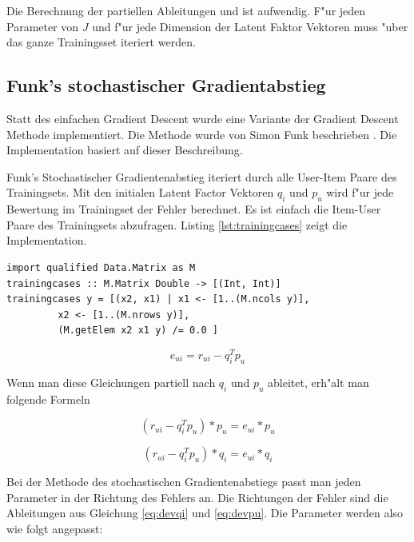 \documentclass[a4paper, 12pt]{article}
\begin{document}
Die Berechnung der partiellen Ableitungen \label{eq:decx} und \label{eq:dectheta} ist aufwendig. F"ur jeden Parameter von $J$ und f"ur jede Dimension der Latent Faktor Vektoren muss "uber das ganze Trainingsset iteriert werden.

\subsection{Funk's stochastischer Gradientabstieg}
\label{sec:funksvd}

Statt des einfachen Gradient Descent wurde eine Variante der Gradient Descent Methode implementiert. Die Methode wurde von Simon Funk beschrieben \cite{funk}. Die Implementation basiert auf dieser Beschreibung.

Funk's Stochastischer Gradientenabstieg iteriert durch alle User-Item Paare des Trainingsets. Mit den initialen Latent Factor Vektoren $q_i$ und $p_u$ wird f"ur jede Bewertung im Trainingset der Fehler berechnet. Es ist einfach die Item-User Paare des Trainingsets abzufragen. Listing \ref{lst:trainingcases} zeigt die Implementation.

\begin{lstlisting}[caption=Abfrage des Trainingsets,label=lst:trainingcases]
import qualified Data.Matrix as M  
trainingcases :: M.Matrix Double -> [(Int, Int)]
trainingcases y = [(x2, x1) | x1 <- [1..(M.ncols y)], 
         x2 <- [1..(M.nrows y)],
         (M.getElem x2 x1 y) /= 0.0 ]
\end{lstlisting}

\begin{equation}
  \label{eq:error1}
  e_{ui} = r_{ui} - q_i^T p_u
\end{equation}

Wenn man diese Gleichungen partiell nach $q_i$ und $p_u$ ableitet, erh"alt man folgende Formeln

\begin{equation}
  \label{eq:devqi}
  (r_{ui} - q_i^T p_u) * p_u =  e_{ui} * p_u
\end{equation}

\begin{equation}
  \label{eq:devpu}
    (r_{ui} - q_i^T p_u) * q_i =  e_{ui} * q_i
\end{equation}

Bei der Methode des stochastischen Gradientenabstiegs passt man jeden Parameter in der Richtung des Fehlers an. Die Richtungen der Fehler sind die Ableitungen aus Gleichung \ref{eq:devqi} und \ref{eq:devpu}. Die Parameter werden also wie folgt angepasst:
\end{document}
